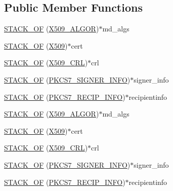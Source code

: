 \subsection*{Public Member Functions}
\begin{DoxyCompactItemize}
\item 
\hyperlink{structpkcs7__signedandenveloped__st_a41ca2fd6d039aa248a7819d161b711fd}{S\+T\+A\+C\+K\+\_\+\+OF} (\hyperlink{crypto_2ossl__typ_8h_aa2b6185e6254f36f709cd6577fb5022e}{X509\+\_\+\+A\+L\+G\+OR})$\ast$md\+\_\+algs
\item 
\hyperlink{structpkcs7__signedandenveloped__st_aca1d7c3b6b2fd28f65e72cae8f033c1f}{S\+T\+A\+C\+K\+\_\+\+OF} (\hyperlink{crypto_2ossl__typ_8h_a4f666bde6518f95deb3050c54b408416}{X509})$\ast$cert
\item 
\hyperlink{structpkcs7__signedandenveloped__st_a389064605c76fdf049439a809e1af73b}{S\+T\+A\+C\+K\+\_\+\+OF} (\hyperlink{crypto_2ossl__typ_8h_ac8661d2485c2c8da5fd7dd26b846f4bf}{X509\+\_\+\+C\+RL})$\ast$crl
\item 
\hyperlink{structpkcs7__signedandenveloped__st_a2ada878a13c6cf8f228678cd52c7132e}{S\+T\+A\+C\+K\+\_\+\+OF} (\hyperlink{crypto_2pkcs7_2pkcs7_8h_a827824ab5bc7870ffbc5213959710815}{P\+K\+C\+S7\+\_\+\+S\+I\+G\+N\+E\+R\+\_\+\+I\+N\+FO})$\ast$signer\+\_\+info
\item 
\hyperlink{structpkcs7__signedandenveloped__st_ac8135debb745184beb113b43ab7fd215}{S\+T\+A\+C\+K\+\_\+\+OF} (\hyperlink{crypto_2pkcs7_2pkcs7_8h_a8b0ed73366ea46f65dfaa11ae7882dad}{P\+K\+C\+S7\+\_\+\+R\+E\+C\+I\+P\+\_\+\+I\+N\+FO})$\ast$recipientinfo
\item 
\hyperlink{structpkcs7__signedandenveloped__st_a41ca2fd6d039aa248a7819d161b711fd}{S\+T\+A\+C\+K\+\_\+\+OF} (\hyperlink{crypto_2ossl__typ_8h_aa2b6185e6254f36f709cd6577fb5022e}{X509\+\_\+\+A\+L\+G\+OR})$\ast$md\+\_\+algs
\item 
\hyperlink{structpkcs7__signedandenveloped__st_aca1d7c3b6b2fd28f65e72cae8f033c1f}{S\+T\+A\+C\+K\+\_\+\+OF} (\hyperlink{crypto_2ossl__typ_8h_a4f666bde6518f95deb3050c54b408416}{X509})$\ast$cert
\item 
\hyperlink{structpkcs7__signedandenveloped__st_a389064605c76fdf049439a809e1af73b}{S\+T\+A\+C\+K\+\_\+\+OF} (\hyperlink{crypto_2ossl__typ_8h_ac8661d2485c2c8da5fd7dd26b846f4bf}{X509\+\_\+\+C\+RL})$\ast$crl
\item 
\hyperlink{structpkcs7__signedandenveloped__st_a2ada878a13c6cf8f228678cd52c7132e}{S\+T\+A\+C\+K\+\_\+\+OF} (\hyperlink{crypto_2pkcs7_2pkcs7_8h_a827824ab5bc7870ffbc5213959710815}{P\+K\+C\+S7\+\_\+\+S\+I\+G\+N\+E\+R\+\_\+\+I\+N\+FO})$\ast$signer\+\_\+info
\item 
\hyperlink{structpkcs7__signedandenveloped__st_ac8135debb745184beb113b43ab7fd215}{S\+T\+A\+C\+K\+\_\+\+OF} (\hyperlink{crypto_2pkcs7_2pkcs7_8h_a8b0ed73366ea46f65dfaa11ae7882dad}{P\+K\+C\+S7\+\_\+\+R\+E\+C\+I\+P\+\_\+\+I\+N\+FO})$\ast$recipientinfo
\end{DoxyCompactItemize}
